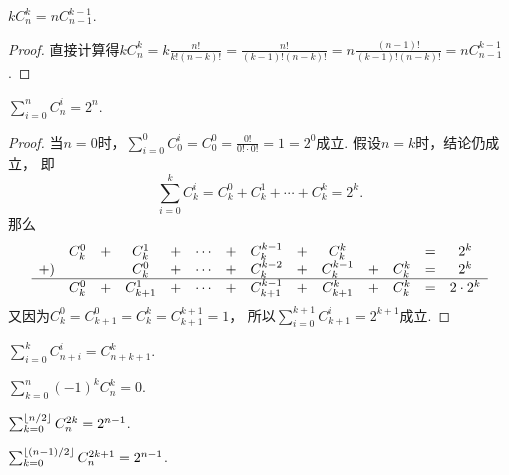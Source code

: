 \begin{property}
\(k C_n^k = n C_{n-1}^{k-1}\).
\begin{proof}
直接计算得\(
	k C_n^k
	= k \frac{n!}{k!(n-k)!}
	= \frac{n!}{(k-1)!(n-k)!}
	= n \frac{(n-1)!}{(k-1)!(n-k)!}
	= n C_{n-1}^{k-1}
\).
\end{proof}
\end{property}

\begin{property}\label{theorem:组合数性质3}
\(\sum_{i=0}^n C_n^i = 2^n\).
\begin{proof}
当\(n=0\)时，\(\sum_{i=0}^0 C_0^i = C_0^0 = \frac{0!}{0! \cdot 0!} = 1 = 2^0\)成立.
假设\(n=k\)时，结论仍成立，
即\begin{equation*}
	\sum_{i=0}^k C_k^i
	= C_k^0 + C_k^1 + \dotsb + C_k^k = 2^k.
\end{equation*}
那么\begin{equation*}
	\begin{array}{*{14}{c}}
		& C_k^0 &+& C_k^1 &+& \dotsb &+& C_k^{k-1} &+& C_k^k && &=& 2^k \\
		+) & && C_k^0 &+& \dotsb &+& C_k^{k-2} &+& C_k^{k-1} &+& C_k^k &=& 2^k \\ \hline
		& C_k^0 &+& C_{k+1}^1 &+& \dotsb &+& C_{k+1}^{k-1} &+& C_{k+1}^k &+& C_k^k &=& 2 \cdot 2^k
	\end{array}
\end{equation*}
又因为\(C_k^0 = C_{k+1}^0 = C_k^k = C_{k+1}^{k+1} = 1\)，
所以\(
	\sum_{i=0}^{k+1} C_{k+1}^i = 2^{k+1}
\)成立.
\end{proof}
\end{property}

\begin{property}
\(
	\sum_{i=0}^k C_{n+i}^i
	= C_{n+k+1}^k
\).
\end{property}

\begin{property}\label{theorem:组合数性质4}
\(\sum_{k=0}^n (-1)^k C_n^k = 0\).
\end{property}

\begin{property}\label{theorem:组合数性质5}
\(\sum_{k=0}^{\lfloor n/2\rfloor} C_n^{2k} = 2^{n-1}\).
\end{property}
\begin{property}\label{theorem:组合数性质6}
\(\sum_{k=0}^{\lfloor(n-1)/2\rfloor} C_n^{2k+1} = 2^{n-1}\).
\end{property}

